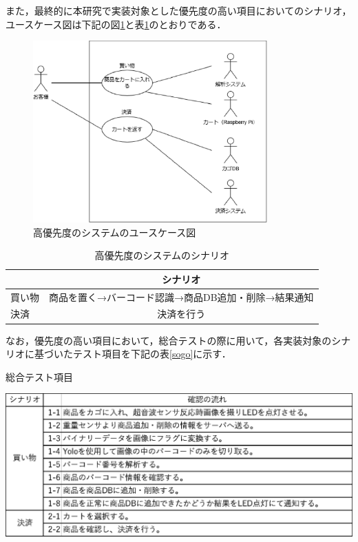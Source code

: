 また，最終的に本研究で実装対象とした優先度の高い項目においてのシナリオ，ユースケース図は下記の図\ref{use}と表\ref{sina}のとおりである．


\begin{figure}[htbp]
\centering
\includegraphics[width = 9cm]{./picture/usecase_saishu.eps}
\caption{高優先度のシステムのユースケース図}
\label{use}
\end{figure}

\begin{table}[htbp]
\begin{center}
\caption{高優先度のシステムのシナリオ}
\begin{tabular}{|l|c|} \hline
 & シナリオ \\ \hline \hline
買い物 & 商品を置く→バーコード認識→商品DB追加・削除→結果通知 \\
決済 & 決済を行う \\ \hline
\end{tabular}
\label{sina}
\end{center}
\end{table}

なお，優先度の高い項目において，総合テストの際に用いて，各実装対象のシナリオに基づいたテスト項目を下記の表\ref{sogo}に示す．

\begin{table}[htbp]
\centering
\caption{総合テスト項目}
\includegraphics[width = 15cm]{./picture/sogo.eps}
\label{sogo}
\end{table}

\newpage